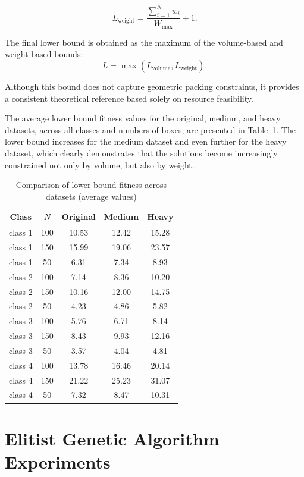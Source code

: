 \[
L_{\mathrm{weight}} = \frac{\sum_{i=1}^{N} w_i}{W_{\max}} + 1.
\]


The final lower bound is obtained as the maximum of the volume-based and weight-based bounds:
\[
L = \max \left(L_{\mathrm{volume}}, L_{\mathrm{weight}}\right).
\]

Although this bound does not capture geometric packing constraints, it provides a consistent theoretical reference based solely on resource feasibility.

The average lower bound fitness values for the original, medium, and heavy datasets, 
across all classes and numbers of boxes, are presented in Table~\ref{tab:lower-bound}.
The lower bound increases for the medium dataset and even further for the heavy dataset, 
which clearly demonstrates that the solutions become increasingly constrained not only by volume, 
but also by weight.

\begin{table}[htbp]
\centering
\caption{Comparison of lower bound fitness across datasets (average values)}
\label{tab:lower-bound}
\begin{tabular}{|c|c|c|c|c|}
\hline
Class & $N$ & Original & Medium & Heavy \\ \hline
class 1 & 100 & 10.53 & 12.42 & 15.28 \\ \hline
class 1 & 150 & 15.99 & 19.06 & 23.57 \\ \hline
class 1 & 50  & 6.31  & 7.34  & 8.93  \\ \hline
class 2 & 100 & 7.14  & 8.36  & 10.20 \\ \hline
class 2 & 150 & 10.16 & 12.00 & 14.75 \\ \hline
class 2 & 50  & 4.23  & 4.86  & 5.82  \\ \hline
class 3 & 100 & 5.76  & 6.71  & 8.14  \\ \hline
class 3 & 150 & 8.43  & 9.93  & 12.16 \\ \hline
class 3 & 50  & 3.57  & 4.04  & 4.81  \\ \hline
class 4 & 100 & 13.78 & 16.46 & 20.14 \\ \hline
class 4 & 150 & 21.22 & 25.23 & 31.07 \\ \hline
class 4 & 50  & 7.32  & 8.47  & 10.31 \\ \hline
\end{tabular}
\end{table}

\section{Elitist Genetic Algorithm Experiments}

